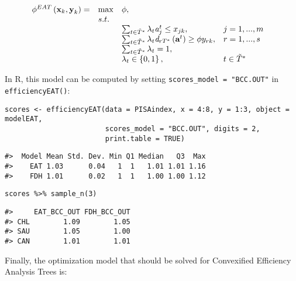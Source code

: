 \begin{equation} \label{(12)} 
\begin{array}{lllll} 
{\phi ^{EAT} \left({\it \textbf{x}}_{k} ,{\it \textbf{y}}_{k} \right)=} & {\max } & {\phi, } & {} & {} \\ 
{} & {s.t.} & {} & {} & {} \\ 
{} & {} & {\sum_{t\in \tilde{T}^{*}} \lambda_{t} {\it a}_{j}^{t}  \le x_{jk} ,} & {j=1,...,m} & {} \\ 
{} & {} & {\sum_{t\in \tilde{T}^{*}} \lambda_{t} {\it d}_{rT^{*}} \left({\it \textbf{a}}^{t} \right) \ge \phi y_{rk} ,} & {r=1,...,s} & {} \\ 
{} & {} & {\sum_{t\in \tilde{T}^{*}}^{}\lambda_{t}  =1,} & {} & {} \\ 
{} & {} & {\lambda _{t} \in \left\{0,1\right\},} & {t\in \tilde{T}^{*} } & {} 
\end{array} 
\end{equation}

In R, this model can be computed by setting \texttt{scores\_model\ =\ "BCC.OUT"} in \texttt{efficiencyEAT()}:

\begin{verbatim}
scores <- efficiencyEAT(data = PISAindex, x = 4:8, y = 1:3, object = modelEAT, 
                        scores_model = "BCC.OUT", digits = 2, 
                        print.table = TRUE)
\end{verbatim}

\begin{verbatim}
#>  Model Mean Std. Dev. Min Q1 Median   Q3  Max
#>    EAT 1.03      0.04   1  1   1.01 1.01 1.16
#>    FDH 1.01      0.02   1  1   1.00 1.00 1.12
\end{verbatim}

\begin{verbatim}
scores %>% sample_n(3)
\end{verbatim}

\begin{verbatim}
#>     EAT_BCC_OUT FDH_BCC_OUT
#> CHL        1.09        1.05
#> SAU        1.05        1.00
#> CAN        1.01        1.01
\end{verbatim}

Finally, the optimization model that should be solved for Convexified Efficiency Analysis Trees is:

